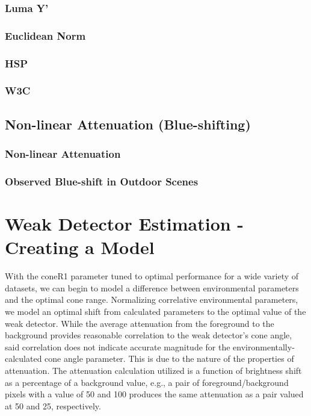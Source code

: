 \documentclass[12pt]{report}
\begin{document}
\subsubsection{Luma Y'}
\subsubsection{Euclidean Norm}
\subsubsection{HSP}
\subsubsection{W3C}

\subsection{Non-linear Attenuation (Blue-shifting)}
\subsubsection{Non-linear Attenuation}
\subsubsection{Observed Blue-shift in Outdoor Scenes}

\section{Weak Detector Estimation - Creating a Model}

With the coneR1 parameter tuned to optimal performance for a wide variety of datasets, we can begin to model a difference between environmental parameters and the optimal cone range. Normalizing correlative environmental parameters, we model an optimal shift from calculated parameters to the optimal value of the weak detector. While the average attenuation from the foreground to the background provides reasonable correlation to the weak detector's cone angle, said correlation does not indicate accurate magnitude for the environmentally-calculated cone angle parameter. This is due to the nature of the properties of attenuation. The attenuation calculation utilized is a function of brightness shift as a percentage of a background value, e.g., a pair of foreground/background pixels with a value of 50 and 100 produces the same attenuation as a pair valued at 50 and 25, respectively.
\end{document}
